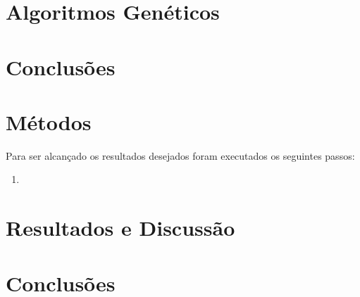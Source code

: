 \documentclass[twoside,conference,a4paper]{IEEEtran}
\begin{document}
  \section{Algoritmos Genéticos} \label{algoritmos_geneticos}
  
   \section{Conclusões} \label{conclusoes}
 
\section{Métodos}

Para ser alcançado os resultados desejados foram executados os seguintes passos:
\begin{enumerate}
 \item
\end{enumerate}


\section{Resultados e Discussão}

\section{Conclusões}

\nocite{Aula}



\end{document}
